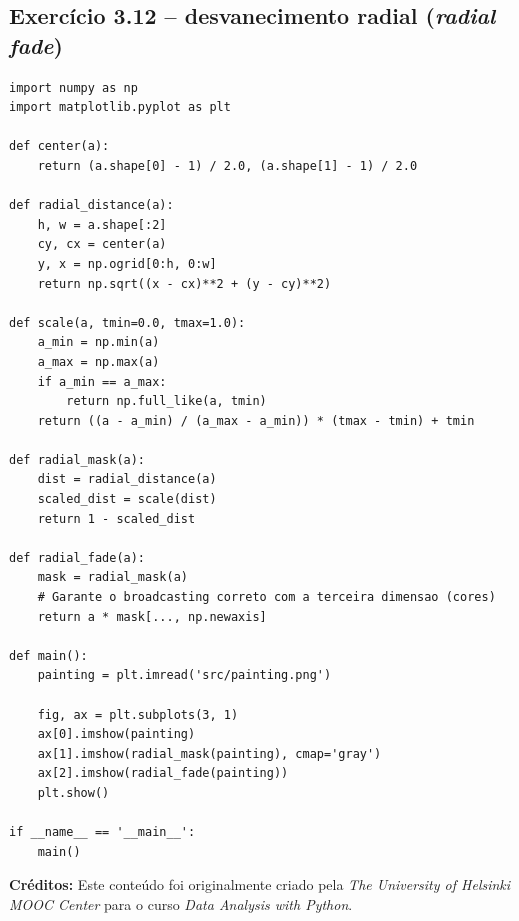 \documentclass[11pt,a4paper]{article}
\begin{document}
\subsection*{Exercício 3.12 -- desvanecimento radial (\textit{radial fade})}

\begin{solucao}
\begin{lstlisting}
import numpy as np
import matplotlib.pyplot as plt

def center(a):
    return (a.shape[0] - 1) / 2.0, (a.shape[1] - 1) / 2.0

def radial_distance(a):
    h, w = a.shape[:2]
    cy, cx = center(a)
    y, x = np.ogrid[0:h, 0:w]
    return np.sqrt((x - cx)**2 + (y - cy)**2)

def scale(a, tmin=0.0, tmax=1.0):
    a_min = np.min(a)
    a_max = np.max(a)
    if a_min == a_max:
        return np.full_like(a, tmin)
    return ((a - a_min) / (a_max - a_min)) * (tmax - tmin) + tmin

def radial_mask(a):
    dist = radial_distance(a)
    scaled_dist = scale(dist)
    return 1 - scaled_dist

def radial_fade(a):
    mask = radial_mask(a)
    # Garante o broadcasting correto com a terceira dimensao (cores)
    return a * mask[..., np.newaxis]

def main():
    painting = plt.imread('src/painting.png')
    
    fig, ax = plt.subplots(3, 1)
    ax[0].imshow(painting)
    ax[1].imshow(radial_mask(painting), cmap='gray')
    ax[2].imshow(radial_fade(painting))
    plt.show()

if __name__ == '__main__':
    main()
\end{lstlisting}
\end{solucao}

\vspace{2em}
\noindent\textbf{Créditos:} Este conteúdo foi originalmente criado pela \textit{The University of Helsinki MOOC Center} para o curso \textit{Data Analysis with Python}.
\end{document}
